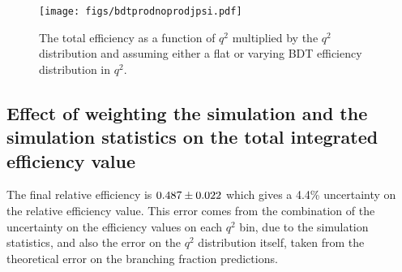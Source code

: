 








\begin{figure}[h]
  \centering
  \texttt{[image: figs/bdtprodnoprodjpsi.pdf]}
  \caption{The total efficiency as a function of $q^{2}$ multiplied by the \LbL $q^{2}$ distribution and assuming either a flat or varying BDT efficiency distribution in $q^{2}$.}
  \label{Fig:q2timeseff}
\end{figure}

\subsection{Effect of weighting the simulation and the simulation statistics on the total integrated efficiency value}
\label{sec:rew}
The final relative efficiency is $0.487\pm0.022$ which gives a 4.4\% uncertainty on the relative efficiency value. This error comes from the combination of the uncertainty on the efficiency values on each $q^{2}$ bin, due to the simulation statistics, and also the error on the $q^{2}$ distribution itself, taken from the theoretical error on the \LbL branching fraction predictions. %

